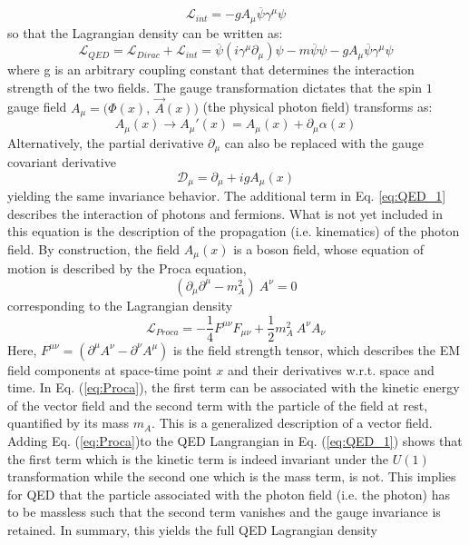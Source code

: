 \begin{equation}
    \mathscr{L}_{int} = -g A_\mu \overline{\psi}\gamma^\mu\psi
\end{equation}
so that the Lagrangian density can be written as:
\begin{equation} \label{eq:QED_1}
    \mathscr{L}_{QED} = \mathscr{L}_{Dirac} + \mathscr{L}_{int} = \overline{\psi} (i\gamma^\mu\partial_\mu)\psi - m\overline{\psi}\psi - g A_\mu \overline{\psi}\gamma^\mu\psi
\end{equation}
where g is an arbitrary coupling constant that determines the interaction strength of the two fields. The gauge transformation dictates that the spin $1$ gauge field $A_\mu = \big(\Phi(x),\: \Vec{A}(x)\big)$ (the physical photon field) transforms as:
\begin{equation}
    A_\mu(x) \rightarrow A_\mu'(x) = A_\mu(x) + \partial_\mu \alpha(x)
\end{equation}
Alternatively, the partial derivative $\partial_\mu$ can also be replaced with the gauge covariant derivative
\begin{equation}\label{eq:covariant}
    \mathscr{D}_\mu = \partial_\mu + igA_\mu(x)
\end{equation}
yielding the same invariance behavior. The additional term in Eq. \ref{eq:QED_1} describes the interaction of photons and fermions. What
is not yet included in this equation is the description of the propagation (i.e. kinematics) of the photon field. By construction, the field $A_\mu(x)$ is a boson field, whose equation of motion is described by the Proca equation,
\begin{equation}
    (\partial_\mu\partial^\mu - m^2_A)\:A^\nu = 0
\end{equation}
corresponding to the Lagrangian density
\begin{equation} \label{eq:Proca}
    \mathscr{L}_{Proca} = -\frac{1}{4}F^{\mu\nu}F_{\mu\nu} + \frac{1}{2}m_A^2\: A^\nu A_\nu
\end{equation}
Here, $F^{\mu\nu} = (\partial^\mu A^\nu - \partial^\nu A^\mu)$ is the field strength tensor, which describes the EM field components at space-time point $x$ and their derivatives w.r.t. space and time. In Eq. (\ref{eq:Proca}), the first term can be associated with the kinetic energy of the vector field and the second term with the particle of the field at rest, quantified by its mass $m_A$. This is a generalized description of a vector field. Adding Eq. (\ref{eq:Proca})to the QED Langrangian in Eq. (\ref{eq:QED_1}) shows that the first term which is the kinetic term is indeed invariant under the $U(1)$ transformation while the second one which is the mass term, is not. This implies for QED that the particle associated with the photon field (i.e. the photon) has to be massless such that the second term vanishes and the gauge invariance is retained. In summary, this yields the full QED Lagrangian density
